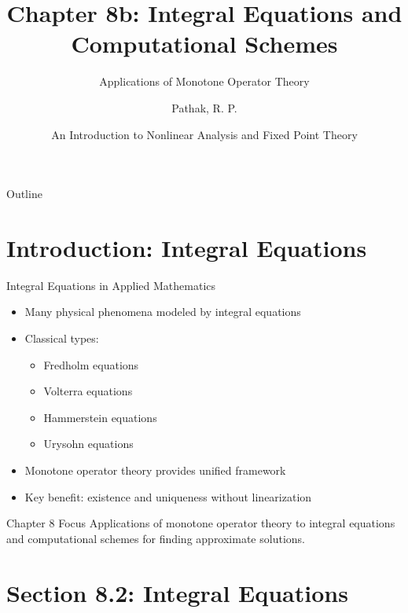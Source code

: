 \documentclass[aspectratio=169,10pt]{beamer}
\title{Chapter 8b: Integral Equations and Computational Schemes}
\subtitle{Applications of Monotone Operator Theory}
\author{Pathak, R. P.}
\date{An Introduction to Nonlinear Analysis and Fixed Point Theory}
\begin{document}
\begin{frame}
    \titlepage
\end{frame}

\begin{frame}{Outline}
    \tableofcontents
\end{frame}

\section{Introduction: Integral Equations}

\begin{frame}{Integral Equations in Applied Mathematics}
    \begin{itemize}
        \item Many physical phenomena modeled by integral equations
        \vspace{0.3cm}
        \item Classical types:
            \begin{itemize}
                \item Fredholm equations
                \item Volterra equations
                \item Hammerstein equations
                \item Urysohn equations
            \end{itemize}
        \vspace{0.3cm}
        \item Monotone operator theory provides unified framework
        \vspace{0.3cm}
        \item Key benefit: existence and uniqueness without linearization
    \end{itemize}

    \vspace{0.5cm}
    \begin{block}{Chapter 8 Focus}
        Applications of monotone operator theory to integral equations and
        computational schemes for finding approximate solutions.
    \end{block}
\end{frame}

\section{Section 8.2: Integral Equations}
\end{document}
